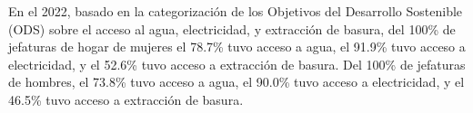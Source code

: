 En el 2022, basado en la categorización de los Objetivos del Desarrollo Sostenible (ODS) sobre el acceso al agua, electricidad, y extracción de basura, del 100\% de jefaturas de hogar de mujeres el 78.7\% tuvo acceso a agua, el 91.9\% tuvo acceso a electricidad, y el 52.6\% tuvo acceso a extracción de basura. Del 100\% de jefaturas de hombres, el 73.8\% tuvo acceso a agua, el 90.0\% tuvo acceso a electricidad, y el 46.5\% tuvo acceso a extracción de basura.